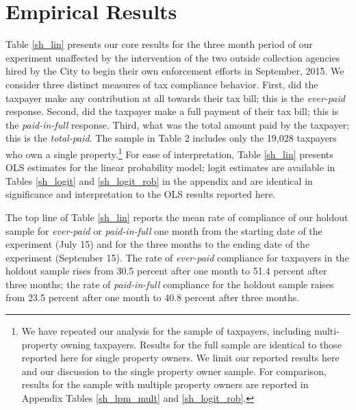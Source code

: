 \documentclass[12pt]{article}
\begin{document}
\section{Empirical Results}

Table \ref{sh_lin} presents our core results for the three month
period of our experiment unaffected by the intervention of the
two outside collection agencies hired by the City to begin their own
enforcement efforts in September, 2015. We consider three distinct
measures of tax compliance behavior. First, did the taxpayer make any
contribution at all towards their tax bill; this is the
\textit{ever-paid} response. Second, did the taxpayer make a full
payment of their tax bill; this is the \textit{paid-in-full}
response. Third, what was the total amount paid by the taxpayer; this is the \textit{total-paid}.  The sample in Table 2  includes only the 19,028 taxpayers
who own a single property.\footnote{We have repeated our analysis for
  the sample of taxpayers, including multi-property owning
  taxpayers. Results for the full sample are identical to those
  reported here for single property owners. We limit our reported
  results here and our discussion to the single property owner sample. For
  comparison, results for the sample with multiple property owners are
  reported in Appendix Tables \ref{sh_lpm_mult} and
  \ref{sh_logit_rob}.} For ease of interpretation, Table \ref{sh_lin}
presents OLS estimates for the linear probability model; logit
estimates are available in Tables \ref{sh_logit} and
\ref{sh_logit_rob} in the appendix and are identical in significance
and interpretation to the OLS results reported here.

The top line of Table \ref{sh_lin} reports the mean rate of compliance
of our holdout sample for \textit{ever-paid} or \textit{paid-in-full}
one month from the starting date of the experiment (July 15) and for
the three months to the ending date of the experiment (September
15). The rate of \textit{ever-paid} compliance for taxpayers in the
holdout sample rises from 30.5 percent after one month to 51.4 percent
after three months; the rate of \textit{paid-in-full} compliance for
the holdout sample raises from 23.5 percent after one month to 40.8
percent after three months.
\end{document}
